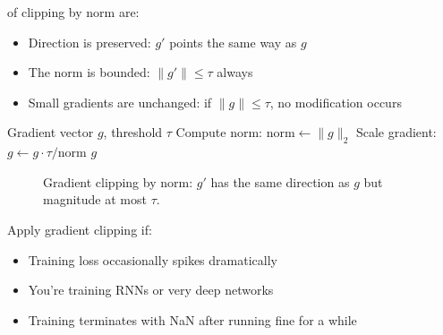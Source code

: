  of clipping by norm are:
\begin{itemize}
    \item Direction is preserved: $g'$ points the same way as $g$
    \item The norm is bounded: $\|g'\| \leq \tau$ always
    \item Small gradients are unchanged: if $\|g\| \leq \tau$, no modification occurs
\end{itemize}

\begin{algorithm}[H]
\caption{Gradient Clipping by Norm}
\begin{algorithmic}[1]
    \Require Gradient vector $g$, threshold $\tau$
    \State Compute norm: $\text{norm} \gets \|g\|_2$
        \State Scale gradient: $g \gets g \cdot \tau / \text{norm}$
    \EndIf
    \Return $g$
\end{algorithmic}
\end{algorithm}

\begin{figure}[h]
    \centering
    \caption{Gradient clipping by norm: $g'$ has the same direction as $g$ but magnitude at most $\tau$.}
    \label{fig:gradient_clipping}
\end{figure}


 Apply gradient clipping if:
\begin{itemize}
    \item Training loss occasionally spikes dramatically
    \item You're training RNNs or very deep networks
    \item Training terminates with NaN after running fine for a while
\end{itemize}




